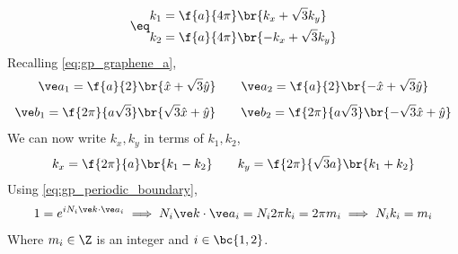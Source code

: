 \documentclass{article}
\begin{document}
\begin{align*}
\eq \label{eq:gp_k1k2}
\begin{split}
k_1 &= \f{a}{4 \pi}\br{k_x + \sqrt{3}k_y} \\
k_2 &= \f{a}{4 \pi}\br{-k_x + \sqrt{3}k_y}
\end{split}
\end{align*}
Recalling \cref{eq:gp_graphene_a},
\[ \ve a_{1} = \f{a}{2} \br{\hat x + \sqrt{3} \hat y} \qquad \ve a_{2} = \f{a}{2} \br{-\hat x + \sqrt{3} \hat y} \]
\[ \ve b_{1} = \f{2 \pi}{a\sqrt{3}} \br{\sqrt{3} \hat x +  \hat y} \qquad \ve b_{2} = \f{2 \pi}{a\sqrt{3}} \br{-\sqrt{3}\hat x +  \hat y}\]
We can now write $k_x, k_y$ in terms of $k_1, k_2$,
\[ k_x = \f{2 \pi }{a} \br{k_1 - k_2} \qquad k_y = \f{2 \pi}{\sqrt{3}a} \br{k_1 + k_2} \]
Using \cref{eq:gp_periodic_boundary},
\[ 1 = e^{i N_i \ve k \cdot \ve a_i} \implies N_i \ve k \cdot \ve a_i = N_i 2 \pi k_i = 2 \pi m_i \implies N_i k_i = m_i \]
Where $m_i \in \Z$ is an integer and $i \in \bc{1,2}$.\\
\end{document}
